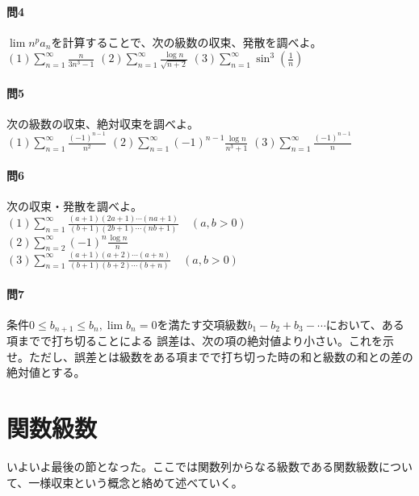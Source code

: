 \documentclass[a4j,dvipdfmx]{jsarticle}
\begin{document}
                \paragraph{問4}$\lim n^p a_n$を計算することで、次の級数の収束、発散を調べよ。\\
                $\displaystyle(1)\sum_{n=1}^{\infty}\frac{n}{3n^3-1}$\hspace{15mm}
                $\displaystyle(2)\sum_{n=1}^{\infty}\frac{\log n}{\sqrt{n+2}}$\hspace{15mm}
                $\displaystyle(3)\sum_{n=1}^{\infty}\sin^3\left(\frac{1}{n}\right)$

                \paragraph{問5}次の級数の収束、絶対収束を調べよ。\\
                $\displaystyle(1)\sum_{n=1}^{\infty}\frac{(-1)^{n-1}}{n^2}$\hspace{15mm}
                $\displaystyle(2)\sum_{n=1}^{\infty}(-1)^{n-1}\frac{\log n}{n^3+1}$\hspace{15mm}
                $\displaystyle(3)\sum_{n=1}^{\infty}\frac{(-1)^{n-1}}{n}$
                
                \paragraph{問6}次の収束・発散を調べよ。\\
                $\displaystyle (1)\sum_{n=1}^{\infty}\frac{(a+1)(2a+1)\cdots(na+1)}{(b+1)(2b+1)\cdots(nb+1)}\quad (a,b>0)$\\
                $\displaystyle (2)\sum_{n=2}^{\infty}(-1)^n\frac{\log n}{n}$\\
                $\displaystyle (3)\sum_{n=1}^{\infty}\frac{(a+1)(a+2)\cdots(a+n)}{(b+1)(b+2)\cdots(b+n)}\quad (a,b>0)$

                \paragraph{問7}条件$0\leq b_{n+1} \leq b_n,\lim b_n =0$を満たす交項級数$b_1-b_2+b_3-\cdots$において、ある項までで打ち切ることによる
                誤差は、次の項の絶対値より小さい。これを示せ。ただし、誤差とは級数をある項までで打ち切った時の和と級数の和との差の絶対値とする。
            \clearpage
        \section{関数級数}
            いよいよ最後の節となった。ここでは関数列からなる級数である関数級数について、一様収束という概念と絡めて述べていく。
\end{document}
